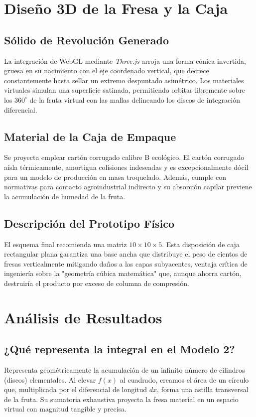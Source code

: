 \documentclass[conference, Spanish]{IEEEtran}
\begin{document}
\section{Diseño 3D de la Fresa y la Caja}
\subsection{Sólido de Revolución Generado}
La integración de WebGL mediante \textit{Three.js} arroja una forma cónica invertida, gruesa en su nacimiento con el eje coordenado vertical, que decrece constantemente hasta sellar un extremo despuntado asimétrico. Los materiales virtuales simulan una superficie satinada, permitiendo orbitar libremente sobre los $360^\circ$ de la fruta virtual con las mallas delineando los discos de integración diferencial.

\subsection{Material de la Caja de Empaque}
Se proyecta emplear cartón corrugado calibre B ecológico. El cartón corrugado aísla térmicamente, amortigua colisiones indeseadas y es excepcionalmente dócil para un modelo de producción en masa troquelado. Además, cumple con normativas para contacto agroindustrial indirecto y su absorción capilar previene la acumulación de humedad de la fruta.

\subsection{Descripción del Prototipo Físico}
El esquema final recomienda una matriz $10 \times 10 \times 5$. Esta disposición de caja rectangular plana garantiza una base ancha que distribuye el peso de cientos de fresas verticalmente mitigando daños a las capas subyacentes, ventaja crítica de ingeniería sobre la "geometría cúbica matemática" que, aunque ahorra cartón, destruiría el producto por exceso de columna de compresión.

\section{Análisis de Resultados}
\subsection{¿Qué representa la integral en el Modelo 2?}
Representa geométricamente la acumulación de un infinito número de cilindros (discos) elementales. Al elevar $f(x)$ al cuadrado, creamos el área de un círculo que, multiplicada por el diferencial de longitud $dx$, forma una astilla transversal de la fruta. Su sumatoria exhaustiva proyecta la fresa material en un espacio virtual con magnitud tangible y precisa.
\end{document}
